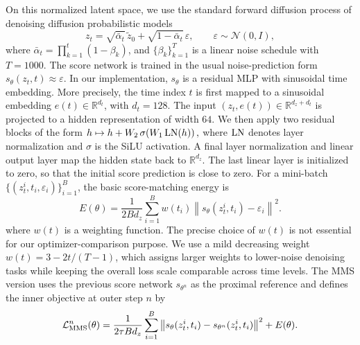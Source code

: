 \documentclass[twoside,11pt]{article}
\begin{document}
On this normalized latent space, we use the standard forward diffusion process
of denoising diffusion probabilistic models \citep{ho2020denoising}
\[
    z_t
    =
    \sqrt{\bar\alpha_t}\,\tilde z_0
    +
    \sqrt{1-\bar\alpha_t}\,\varepsilon,
    \qquad
    \varepsilon\sim\mathcal N(0,I),
\]
where \(\bar\alpha_t=\prod_{k=1}^t(1-\beta_k)\), and \(\{\beta_k\}_{k=1}^{T}\)
is a linear noise schedule with \(T=1000\). The score network is trained in the
usual noise-prediction form
\(
    s_\theta(z_t,t)\approx \varepsilon .
\)
In our implementation, \(s_\theta\) is a residual MLP with sinusoidal time
embedding. More precisely, the time index \(t\) is first mapped to a sinusoidal
embedding \(e(t)\in\mathbb R^{d_t}\), with \(d_t=128\). The input
\((z_t,e(t))\in\mathbb R^{d_z+d_t}\) is projected to a hidden representation of
width \(64\). We then apply two residual blocks of the form
\(
    h \mapsto h +
    W_2\,\sigma\!\left(W_1\,{\rm LN}(h)\right),
\)
where \({\rm LN}\) denotes layer normalization and \(\sigma\) is the SiLU
activation. A final layer normalization and linear output layer map the hidden
state back to \(\mathbb R^{d_z}\). The last linear layer is initialized to zero,
so that the initial score prediction is close to zero. For a mini-batch \(\{(z_t^i,t_i,\varepsilon_i)\}_{i=1}^B\), the basic
score-matching energy is
\[
    E(\theta)
    =
    \frac{1}{2B d_z}
    \sum_{i=1}^B
    w(t_i)\left\|
    s_\theta(z_t^i,t_i)-\varepsilon_i
    \right\|^2 .
\]
where $w(t)$ is a weighting function. The precise choice of \(w(t)\) is not essential for our optimizer-comparison
purpose. We use a mild decreasing weight \(w(t)=3-2t/(T-1)\), which assigns
larger weights to lower-noise denoising tasks while keeping the overall loss
scale comparable across time levels.
The MMS version uses the previous score network \(s_{\theta^n}\) as the proximal
reference and defines the inner objective at outer step \(n\) by
\[
    \mathcal L_{\rm MMS}^{n}(\theta)
    =
    \frac{1}{2\tau B d_z}
    \sum_{i=1}^B
    \left\|
    s_\theta(z_t^i,t_i)-s_{\theta^n}(z_t^i,t_i)
    \right\|^2
    + E(\theta) .
\]
\end{document}
